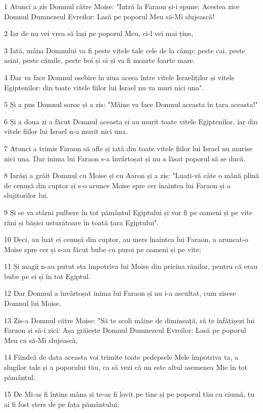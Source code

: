 \par 1 Atunci a zis Domnul către Moise: "Intră la Faraon și-i spune: Acestea zice Domnul Dumnezeul Evreilor: Lasă pe poporul Meu să-Mi slujească!
\par 2 Iar de nu vei vrea să lași pe poporul Meu, ci-l vei mai ține,
\par 3 Iată, mâna Domnului va fi peste vitele tale cele de la câmp: peste cai, peste asini, peste cămile, peste boi și oi și va fi moarte foarte mare.
\par 4 Dar va face Domnul osebire în ziua aceea între vitele Israeliților și vitele Egiptenilor: din toate vitele fiilor lui Israel nu va muri nici una".
\par 5 Și a pus Domnul soroc și a zis: "Mâine va face Domnul aceasta în țara aceasta!"
\par 6 Și a doua zi a făcut Domnul aceasta și au murit toate vitele Egiptenilor, iar din vitele fiilor lui Israel n-a murit nici una.
\par 7 Atunci a trimis Faraon să afle și iată din toate vitele fiilor lui Israel nu murise nici una. Dar inima lui Faraon s-a învârtoșat și nu a lăsat poporul să se ducă.
\par 8 Iarăși a grăit Domnul cu Moise și cu Aaron și a zis: "Luați-vă câte o mână plină de cenușă din cuptor și s-o arunce Moise spre cer înaintea lui Faraon și a slujitorilor lui.
\par 9 Și se va stârni pulbere în tot pământul Egiptului și vor fi pe oameni și pe vite răni și bășici usturătoare în toată țara Egiptului".
\par 10 Deci, au luat ei cenușă din cuptor, au mers înaintea lui Faraon, a aruncat-o Moise spre cer și s-au făcut bube cu puroi pe oameni și pe vite;
\par 11 Și magii n-au putut sta împotriva lui Moise din pricina rănilor, pentru că erau bube pe ei și în tot Egiptul.
\par 12 Dar Domnul a învârtoșat inima lui Faraon și nu i-a ascultat, cum zisese Domnul lui Moise.
\par 13 Zis-a Domnul către Moise: "Să te scoli mâine de dimineață, să te înfățișezi lui Faraon și să-i zici: Așa grăiește Domnul Dumnezeul Evreilor: Lasă pe poporul Meu ca să-Mi slujească,
\par 14 Fiindcă de data aceasta voi trimite toate pedepsele Mele împotriva ta, a slugilor tale și a poporului tău, ca să vezi că nu este altul asemenea Mie în tot pământul.
\par 15 De Mi-aș fi întins mâna și te-aș fi lovit pe tine și pe poporul tău cu ciumă, tu ai fi fost șters de pe fața pământului;
